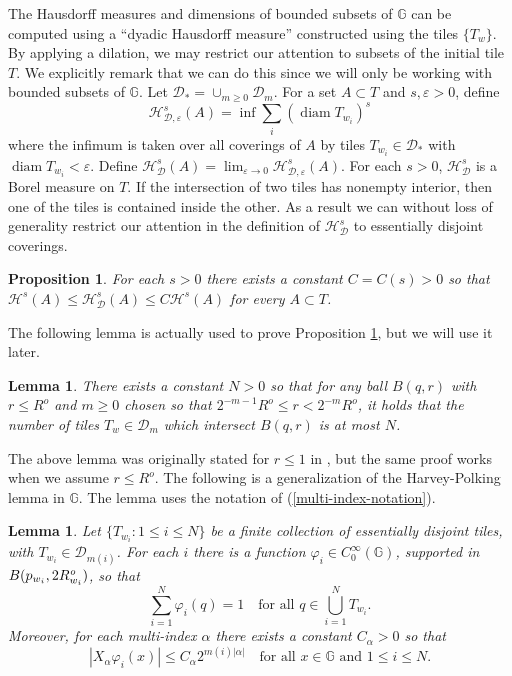 \documentclass[12pt,a4paper,reqno]{amsart}
\newcommand{\out}{{\it o}}
\newcommand{\Rout}{R^{\out}}
\newcommand{\cD}{{\mathcal D}}
\newcommand{\cH}{{\mathcal H}}
\newcommand{\G}{\mathbb{G}}
\newcommand{\diam}{\operatorname{diam}}
\numberwithin{equation}{section}
\newtheorem{prop}[thm]{Proposition}
\newtheorem{lem}[thm]{Lemma}
\theoremstyle{definition}
\begin{document}
The Hausdorff measures and dimensions of bounded subsets of $\G$ can
be computed using a ``dyadic Hausdorff measure'' constructed using the
tiles $\{T_w\}$. By applying a dilation, we may restrict our attention
to subsets of the initial tile $T$. We explicitly remark that we can do this since we will only be working with bounded subsets of $\G$. Let $\cD_* = \cup_{m\ge 0} \cD_m$.
For a set $A \subset T$ and $s,\varepsilon>0$, define
$$
\cH_{\cD,\varepsilon}^s(A) = \inf \sum_i (\diam T_{w_i})^s
$$
where the infimum is taken over all coverings of $A$ by tiles $T_{w_i}
\in \cD_*$ with $\diam T_{w_i} < \varepsilon$. Define $\cH_\cD^s(A) =
\lim_{\varepsilon \rightarrow 0} \cH_{\cD,\varepsilon}^s(A)$. For each $s>0$, $\cH_\cD^s$ is a
Borel measure on $T$. If the intersection of two
tiles has nonempty interior, then one of the tiles is contained inside
the other. As a result we can without loss of generality restrict our
attention in the definition of $\cH_{\cD}^s$ to essentially disjoint
coverings.

\begin{prop}\cite[Proposition 3.5]{CT}\label{T-property-2}
For each $s>0$ there exists a constant $C=C(s)>0$ so that
$\cH^s(A) \leq \cH^s_\cD(A) \leq C \cH^s(A)$ for every $A \subset T$.
\end{prop}
The following lemma is actually used to prove Proposition \ref{T-property-2}, but we will use it later.
\begin{lem}\label{doubling_spaces}
There exists a constant $N > 0$ so that for any ball $B(q,r)$ with $r \leq R^o$ and $m \geq 0$ chosen so that $2^{-m-1} R^o \leq r < 2^{-m} R^o$, it holds that the number of tiles $T_w \in \cD_m$ which intersect $B(q,r)$ is at most $N$.
\end{lem}
The above lemma was originally stated for $r \leq 1$ in \cite[Lemma 3.6]{CT}, but the same proof works when we assume $r \leq R^o$. The following is a generalization of the Harvey-Polking lemma in $\G$. The lemma uses the notation of (\ref{multi-index-notation}).
\begin{lem}\cite[Lemma 3.8]{CT}\label{T-property-7}
Let $\{T_{w_i}:1\leq i\leq N\}$ be a finite collection of essentially
disjoint tiles, with $T_{w_i} \in \cD_{m(i)}$. For each $i$ there is a
function $\varphi_i \in C^\infty_0(\G)$, supported in
$B(p_{w_i},2\Rout_{w_i})$, so that
$$
\sum_{i=1}^N \varphi_i(q) = 1 \quad \mbox{for all $q \in
  \bigcup_{i=1}^N T_{w_i}$.}
$$
Moreover, for each multi-index $\alpha$ there exists a constant
$C_\alpha>0$ so that
$$
|X_\alpha \varphi_i(x)| \le C_\alpha 2^{m(i)|\alpha|} \quad
\mbox{for all $x \in \G$ and $1\leq i\leq N$.}
$$
\end{lem}
\end{document}
